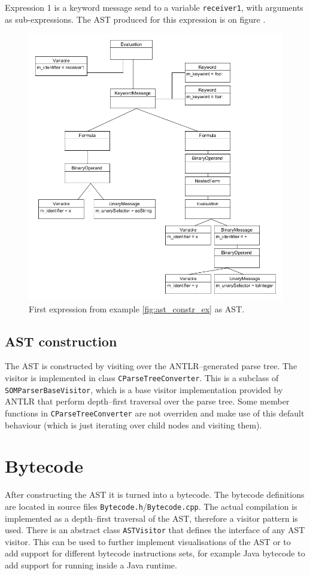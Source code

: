 \documentclass[thesis=M,english]{FITthesis}[2019/12/23]
\begin{document}
Expression 1 is a keyword message send to a variable \texttt{receiver1}, with arguments as sub-expressions. The AST produced for this expression is
on figure .

\begin{figure}[h!]
	\centering
	\includegraphics[width=\textwidth]{media/exp_ast_1.png}
	\caption{First expression from example \ref{fig:ast_constr_ex} as AST.}
	\label{fig:ast_const_ex_1}
\end{figure}

\subsection{AST construction}
The AST is constructed by visiting over the ANTLR--generated parse tree. The visitor is implemented in class \texttt{CParseTreeConverter}. This is a subclass
of \texttt{SOMParserBaseVisitor}, which is a base visitor implementation provided by ANTLR that perform depth--first traversal over the parse tree. Some member
functions in \texttt{CParseTreeConverter} are not overriden and make use of this default behaviour (which is just iterating over child nodes and visiting them).

\section{Bytecode}
After constructing the AST it is turned into a bytecode. The bytecode definitions are located in source files \texttt{Bytecode.h}/\texttt{Bytecode.cpp}. The actual
compilation is implemented as a depth--first traversal of the AST, therefore a visitor pattern is used. There is an abstract class \texttt{ASTVisitor} that defines
the interface of any AST visitor. This can be used to further implement visualisations of the AST or to add support for different bytecode instructions sets,
for example Java bytecode to add support for running inside a Java runtime.
\end{document}

